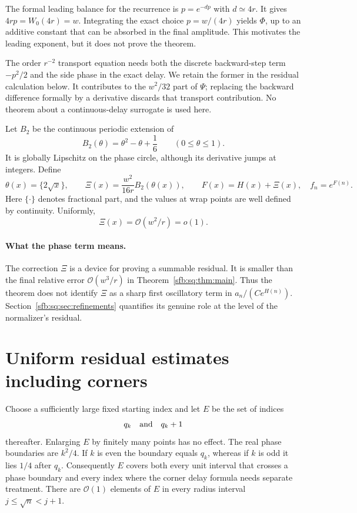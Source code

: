 \documentclass[11pt]{article}
\theoremstyle{remark}\newtheorem{remark}[theorem]{Remark}
\newcommand{\OO}{\mathcal O}
\begin{document}
The formal leading balance for the recurrence is $p=e^{-dp}$ with $d\simeq4r$. It gives $4rp=W_0(4r)=w$. Integrating the exact choice $p=w/(4r)$ yields $\Phi$, up to an additive constant that can be absorbed in the final amplitude. This motivates the leading exponent, but it does not prove the theorem.

The order $r^{-2}$ transport equation needs both the discrete backward-step term $-p^2/2$ and the side phase in the exact delay. We retain the former in the residual calculation below. It contributes to the $w^2/32$ part of $\Psi$; replacing the backward difference formally by a derivative discards that transport contribution. No theorem about a continuous-delay surrogate is used here.

Let $B_2$ be the continuous periodic extension of
\begin{equation}\label{sfb:sq:eq:bernoulli}
 B_2(\theta)=\theta^2-\theta+\frac16\qquad(0\le\theta\le1).
\end{equation}
It is globally Lipschitz on the phase circle, although its derivative jumps at integers. Define
\begin{equation}\label{sfb:sq:eq:Xi}
 \theta(x)=\{2\sqrt x\},\qquad
 \Xi(x)=\frac{w^2}{16r}B_2(\theta(x)),\qquad
 F(x)=H(x)+\Xi(x),\quad f_n=e^{F(n)}.
\end{equation}
Here $\{\cdot\}$ denotes fractional part, and the values at wrap points are well defined by continuity. Uniformly,
\begin{equation}\label{sfb:sq:eq:Xiorder}
 \Xi(x)=\OO(w^2/r)=o(1).
\end{equation}

\paragraph{What the phase term means.}
The correction $\Xi$ is a device for proving a summable residual. It is smaller than the final relative error $\OO(w^3/r)$ in Theorem~\ref{sfb:sq:thm:main}. Thus the theorem does not identify $\Xi$ as a sharp first oscillatory term in $a_n/(Ce^{H(n)})$. Section~\ref{sfb:sq:sec:refinements} quantifies its genuine role at the level of the normalizer's residual.

\section{Uniform residual estimates including corners}\label{sfb:sq:sec:residual}
Choose a sufficiently large fixed starting index and let $E$ be the set of indices
\begin{equation}\label{sfb:sq:eq:E}
 q_k\quad\hbox{and}\quad q_k+1
\end{equation}
thereafter. Enlarging $E$ by finitely many points has no effect. The real phase boundaries are $k^2/4$. If $k$ is even the boundary equals $q_k$, whereas if $k$ is odd it lies $1/4$ after $q_k$. Consequently $E$ covers both every unit interval that crosses a phase boundary and every index where the corner delay formula needs separate treatment. There are $\OO(1)$ elements of $E$ in every radius interval $j\le\sqrt n<j+1$.
\end{document}
